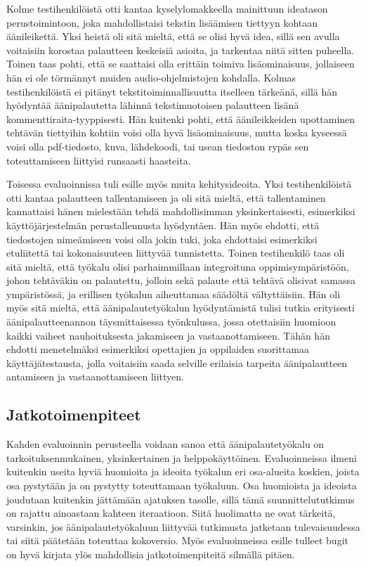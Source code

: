 \documentclass[utf8]{gradu3}
\begin{document}
Kolme testihenkilöistä otti kantaa kyselylomakkeella mainittuun ideatason perustoimintoon, joka mahdollistaisi tekstin lisäämisen tiettyyn kohtaan äänileikettä. Yksi heistä oli sitä mieltä, että se olisi hyvä idea, sillä sen avulla voitaisiin korostaa palautteen keskeisiä asioita, ja tarkentaa niitä sitten puheella. Toinen taas pohti, että se saattaisi olla erittäin toimiva lisäominaisuus, jollaiseen hän ei ole törmännyt muiden audio-ohjelmistojen kohdalla.  Kolmas testihenkilöistä ei pitänyt tekstitoiminnallisuutta itselleen tärkeänä, sillä hän hyödyntää äänipalautetta lähinnä tekstimuotoisen palautteen lisänä kommenttiraita-tyyppisesti. Hän kuitenki pohti, että äänileikkeiden upottaminen tehtävän tiettyihin kohtiin voisi olla hyvä lisäominaisuus, mutta koska kyseessä voisi olla pdf-tiedosto, kuva, lähdekoodi, tai usean tiedoston rypäs sen toteuttamiseen liittyisi runsaasti haasteita.

Toisessa evaluoinnissa tuli esille myös muita kehitysideoita. Yksi testihenkilöistä otti kantaa palautteen tallentamiseen ja oli sitä mieltä, että tallentaminen kannattaisi hänen mielestään tehdä mahdollisimman yksinkertaisesti, esimerkiksi käyttöjärjestelmän perustallennusta hyödyntäen. Hän myös ehdotti, että tiedostojen nimeämiseen voisi olla jokin tuki, joka ehdottaisi esimerkiksi etuliitettä tai kokonaisuuteen liittyvää tunnistetta. Toinen testihenkilö taas oli sitä mieltä, että työkalu olisi parhaimmillaan integroituna oppimisympäristöön, johon tehtäväkin on palautettu, jolloin sekä palaute että tehtävä olisivat samassa ympäristössä, ja erillisen työkalun aiheuttamaa säädöltä vältyttäisiin. Hän oli myös sitä mieltä, että äänipalautetyökalun hyödyntämistä tulisi tutkia erityisesti äänipalautteenannon täysmittaisessa työnkulussa, jossa otettaisiin huomioon kaikki vaiheet nauhoituksesta jakamiseen ja vastaanottamiseen. Tähän hän ehdotti menetelmäksi esimerkiksi opettajien ja oppilaiden suorittamaa käyttäjätestausta, jolla voitaisiin saada selville erilaisia tarpeita äänipalautteen antamiseen ja vastaanottamiseen liittyen.

\subsection{Jatkotoimenpiteet}

Kahden evaluoinnin perusteella voidaan sanoa että äänipalautetyökalu on tarkoituksenmukainen, yksinkertainen ja helppokäyttöinen. Evaluoinneissa ilmeni kuitenkin useita hyviä huomioita ja ideoita työkalun eri osa-alueita koskien, joista osa pystytään ja on pystytty toteuttamaan työkaluun. Osa huomioista ja ideoista joudutaan kuitenkin jättämään ajatuksen tasolle, sillä tämä suunnittelututkimus on rajattu ainoastaan kahteen iteraatioon. Siitä huolimatta ne ovat tärkeitä, varsinkin, jos äänipalautetyökaluun liittyvää tutkimusta jatketaan tulevaisuudessa tai siitä päätetään toteuttaa kokoversio. Myös evaluoinneissa esille tulleet bugit on hyvä kirjata ylös mahdollisia jatkotoimenpiteitä silmällä pitäen.
\end{document}
